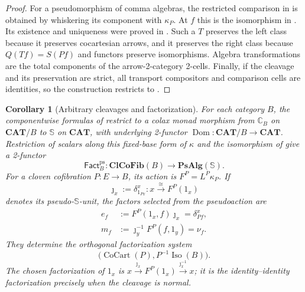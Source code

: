\documentclass[11pt]{article}
\theoremstyle{plain}
\newtheorem{corollary}[theorem]{Corollary}
\theoremstyle{definition}
\theoremstyle{remark}
\newcommand{\CAT}{\mathbf{CAT}}
\newcommand{\ClCoFib}{\mathbf{ClCoFib}}
\newcommand{\PsAlg}{\mathbf{PsAlg}}
\newcommand{\CoCart}{\operatorname{CoCart}}
\newcommand{\Iso}{\operatorname{Iso}}
\newcommand{\Dom}{\operatorname{Dom}}
\newcommand{\C}{\mathbb{C}}
\newcommand{\Sq}{\mathbb{S}}
\newcommand{\Fact}{\mathsf{Fact}}
\numberwithin{equation}{section}
\begin{document}
\begin{proof}
For a pseudomorphism of comma algebras, the restricted comparison in
 is obtained by whiskering its
component with $\kappa_P$.  At $f$ this is the isomorphism in
.  Its existence and uniqueness were
proved in .  Such a $T$ preserves the left
class because it preserves cocartesian arrows, and it preserves the
right class because $Q(Tf)=S(Pf)$ and functors preserve isomorphisms.
Algebra transformations are the total components of the
arrow-2-category 2-cells.  Finally, if the cleavage and its preservation
are strict, all transport compositors and comparison cells are
identities, so the construction restricts to
.
\end{proof}

\begin{corollary}[Arbitrary cleavages and factorization]
\label{cor:fixed-base-pseudo-factorization}
For each category $B$, the componentwise formulas of
 restrict to a colax monad morphism
from $\C_B$ on $\CAT/B$ to $\Sq$ on $\CAT$, with underlying 2-functor
$\Dom\colon\CAT/B\to\CAT$.
Restriction of scalars along this fixed-base form of $\kappa$ and the
isomorphism of
 give a 2-functor
\begin{equation}
  \Fact^{\mathrm{ps}}_B\colon
  \ClCoFib(B)\longrightarrow\PsAlg(\Sq).
  \label{eq:fixed-base-pseudo-Fact}
\end{equation}
For a cloven cofibration $P\colon E\to B$, its action is
$F^P=L^P\kappa_P$.  If
\begin{equation*}
  \jmath_x:=\delta^x_{1_{Px}}\colon
  x\xrightarrow{\ \cong\ }F^P(1_x)
\end{equation*}
denotes its pseudo-$\Sq$-unit, the factors selected from the
pseudoaction are
\begin{align}
  e_f&:=F^P(1_x,f)\jmath_x=\delta^x_{Pf},
  \label{eq:nonnormal-left-factor}\\
  m_f&:=\jmath_y^{-1}F^P(f,1_y)=\nu_f.
  \label{eq:nonnormal-right-factor}
\end{align}
They determine the orthogonal factorization system
\begin{equation}
  \bigl(\CoCart(P),P^{-1}\Iso(B)\bigr).
  \label{eq:fixed-base-pseudo-OFS}
\end{equation}
The chosen factorization of $1_x$ is
$x\xrightarrow{\jmath_x}F^P(1_x)
\xrightarrow{\jmath_x^{-1}}x$; it is the identity--identity
factorization precisely when the cleavage is normal.
\end{corollary}
\end{document}
